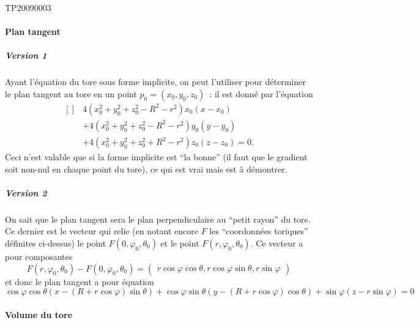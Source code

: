 \begin{corrige}{TP20090003}
\paragraph{Plan tangent}
\subparagraph{Version 1}
Ayant l'équation du tore sous forme implicite, on peut l'utiliser pour
déterminer le plan tangent au tore en un point $p_0 = (x_0,y_0,z_0)$~:
il est donné par l'équation
\begin{equation}
	\begin{aligned}[]
  &4 (x_0^2 + y_0^2 + z_0^2 - R^2 - r^2) x_0 (x - x_0)\\ 
  &+ 4 (x_0^2 +y_0^2 + z_0^2 - R^2 - r^2) y_0 (y - y_0)\\
  &+ 4 (x_0^2 + y_0^2 + z_0^2 + R^2 - r^2) z_0 (z - z_0) = 0.
	\end{aligned}
\end{equation}
Ceci n'est valable que si la forme implicite est ``la bonne'' (il faut
que le gradient soit non-nul en chaque point du tore), ce qui est vrai
mais est à démontrer.

\subparagraph{Version 2}
On sait que le plan tangent sera le plan perpendiculaire au ``petit
rayon'' du tore. Ce dernier est le vecteur qui relie (en notant encore
$F$ les ``coordonnées toriques'' définites ci-dessus) le point
$F(0,\varphi_0,\theta_0)$ et le point $F(r,\varphi_0,\theta_0)$. Ce
vecteur a pour composantes
\begin{equation*}
  F(r,\varphi_0,\theta_0) - F(0,\varphi_0,\theta_0) = 
  \begin{pmatrix}
    r \cos \varphi \cos \theta,r \cos \varphi \sin \theta,r \sin
    \varphi
  \end{pmatrix}
\end{equation*}
et donc le plan tangent a pour équation
\begin{equation*}
  \cos \varphi \cos \theta (x - (R + r \cos \varphi)\sin\theta) + \cos
  \varphi \sin \theta (y - (R + r \cos \varphi)\cos\theta) + \sin
  \varphi (z - r \sin \varphi) = 0
\end{equation*}

\paragraph{Volume du tore}


\end{corrige}
